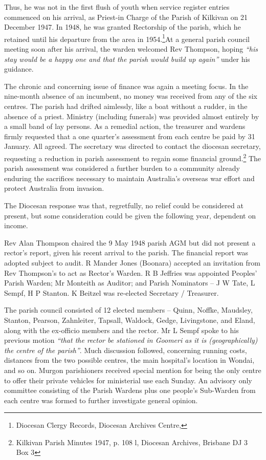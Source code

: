 Thus, he was not in the first flush of youth when service register entries commenced on his arrival, as Priest-in Charge of the Parish of Kilkivan on 21 December 1947. In 1948, he was granted Rectorship of the parish, which he retained until his departure from the area in 1954.\footnote{Diocesan Clergy Records, Diocesan Archives Centre,}At a general parish council meeting soon after his arrival, the warden welcomed Rev Thompson, hoping \emph{``his stay would be a happy one and that the parish would build up again''} under his guidance.

The chronic and concerning issue of finance was again a meeting focus. In the nine-month absence of an incumbent, no money was received from any of the six centres. The parish had drifted aimlessly, like a boat without a rudder, in the absence of a priest. Ministry (including funerals) was provided almost entirely by a small band of lay persons. As a remedial action, the treasurer and wardens firmly requested that a one quarter's assessment from each centre be paid by 31 January. All agreed. The secretary was directed to contact the diocesan secretary, requesting a reduction in parish assessment to regain some financial ground.\footnote{Kilkivan Parish Minutes 1947, p. 108 l, Diocesan Archives, Brisbane DJ 3 Box 3} The parish assessment was considered a further burden to a community already enduring the sacrifices necessary to maintain Australia's overseas war effort and protect Australia from invasion.

The Diocesan response was that, regretfully, no relief could be considered at present, but some consideration could be given the following year, dependent on income.

Rev Alan Thompson chaired the 9 May 1948 parish AGM but did not present a rector's report, given his recent arrival to the parish. The financial report was adopted subject to audit. R Mander Jones (Boonara) accepted an invitation from Rev Thompson's to act as Rector's Warden. R B Jeffries was appointed Peoples' Parish Warden; Mr Monteith as Auditor; and Parish Nominators -- J W Tate, L Sempf, H P Stanton. K Beitzel was re-elected Secretary / Treasurer.

The parish council consisted of 12 elected members -- Quinn, Noffke, Maudsley, Stanton, Pearson, Zahnleiter, Tapsall, Waldock, Gedge, Livingstone, and Eland, along with the ex-officio members and the rector. Mr L Sempf spoke to his previous motion \emph{``that the rector be stationed in Goomeri as it is (geographically) the centre of the parish''}. Much discussion followed, concerning running costs, distances from the two possible centres, the main hospital's location in Wondai, and so on. Murgon parishioners received special mention for being the only centre to offer their private vehicles for ministerial use each Sunday. An advisory only committee consisting of the Parish Wardens plus one people's Sub-Warden from each centre was formed to further investigate general opinion.

